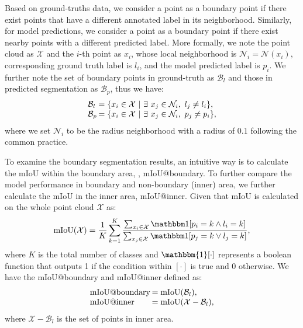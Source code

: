 \documentclass[10pt,twocolumn,letterpaper]{article}
\begin{document}
Based on ground-truths data, we consider a point as a boundary point if there exist points that have a different annotated label in its neighborhood. Similarly, for model predictions, we consider a point as a boundary point if there exist nearby points with a different predicted label.
More formally, we note the point cloud as $\mathcal X$ and the $i$-th point as $x_i$, whose local neighborhood is $\mathcal N_i = \mathcal N(x_i)$, corresponding ground truth label is $l_i$, and the model predicted label is $p_i$. We further note the set of boundary points in ground-truth as $\mathcal B_{l}$ and those in predicted segmentation as $\mathcal B_{p}$, thus we have:
\begin{equation}
\begin{array}{ll}
    \mathcal B_{l}  & \hspace{-8pt} = \{x_i \in \mathcal X \text{ } | \text{ } \exists ~ x_j\in \mathcal N_i, \text{ } l_j \neq l_i \}, \\
    \mathcal B_{p}  & \hspace{-8pt} = \{x_i \in \mathcal X \text{ } | \text{ } \exists ~ x_j\in \mathcal N_i, \text{ } p_j \neq p_i \},
\end{array}
\label{eq:bound}
\end{equation}
where we set $\mathcal N_i$ to be the radius neighborhood with a radius of $0.1$ following the common practice\cite{kpconv, closerlook}.

To examine the boundary segmentation results, an intuitive way is to calculate the mIoU within the boundary area, \ie, mIoU@boundary. To further compare the model performance in boundary and non-boundary (inner) area, we further calculate the mIoU in the inner area, \ie mIoU@inner.
Given that mIoU is calculated on the whole point cloud $\mathcal X$ as:
\begin{equation}
    \text{mIoU}(\mathcal X) = \frac 1K \sum_{k=1}^K \frac{\sum_{x_i\in\mathcal X} \mathbbm 1 [p_i = k \land l_i=k]} {\sum_{x_j\in\mathcal X} \mathbbm 1 [p_j=k \lor l_j=k]},
\label{eq:miou}
\end{equation}
where $K$ is the total number of classes and $\mathbbm{1}[\cdot]$ represents a boolean function that outputs 1 if the condition within $[\cdot]$ is true and 0 otherwise.
We have the mIoU@boundary and mIoU@inner defined as:
\begin{equation}
\begin{array}{ll}
\text{mIoU@boundary} &  \hspace{-8pt}= \text{mIoU}(\mathcal B_l), \\
\text{mIoU@inner} &  \hspace{-8pt}= \text{mIoU}(\mathcal X - \mathcal B_l),
\end{array}
\label{eq:bound_miou}
\end{equation}
where $\mathcal X - \mathcal B_l$ is the set of points in inner area.
\end{document}
